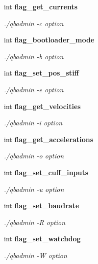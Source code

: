 \begin{DoxyCompactItemize}
int \textbf{ flag\+\_\+get\+\_\+currents}
\begin{DoxyCompactList}\small\item\em ./qbadmin -\/c option \end{DoxyCompactList}\item 
\mbox{\label{structglobal__args_a8488439bc3473b5fb08964d06b51b80a}} 
int \textbf{ flag\+\_\+bootloader\+\_\+mode}
\begin{DoxyCompactList}\small\item\em ./qbadmin -\/b option \end{DoxyCompactList}\item 
\mbox{\label{structglobal__args_ac814e1ddd60d50ef7e0aeac6a5ea38b0}} 
int \textbf{ flag\+\_\+set\+\_\+pos\+\_\+stiff}
\begin{DoxyCompactList}\small\item\em ./qbadmin -\/e option \end{DoxyCompactList}\item 
\mbox{\label{structglobal__args_aa9b8d91302ac6dbb99023c9363c352f8}} 
int \textbf{ flag\+\_\+get\+\_\+velocities}
\begin{DoxyCompactList}\small\item\em ./qbadmin -\/i option \end{DoxyCompactList}\item 
\mbox{\label{structglobal__args_af72013af180143fd3cce334fca450bec}} 
int \textbf{ flag\+\_\+get\+\_\+accelerations}
\begin{DoxyCompactList}\small\item\em ./qbadmin -\/o option \end{DoxyCompactList}\item 
\mbox{\label{structglobal__args_a8bae74d00a58818ba0dad8bc3fb46625}} 
int \textbf{ flag\+\_\+set\+\_\+cuff\+\_\+inputs}
\begin{DoxyCompactList}\small\item\em ./qbadmin -\/u option \end{DoxyCompactList}\item 
\mbox{\label{structglobal__args_aeb7e77450221e7de1da5ae0701a8c7af}} 
int \textbf{ flag\+\_\+set\+\_\+baudrate}
\begin{DoxyCompactList}\small\item\em ./qbadmin -\/R option \end{DoxyCompactList}\item 
\mbox{\label{structglobal__args_a5416bb93d203c57a7fc6fe93957f5c14}} 
int \textbf{ flag\+\_\+set\+\_\+watchdog}
\begin{DoxyCompactList}\small\item\em ./qbadmin -\/W option \end{DoxyCompactList}\item 

\end{DoxyCompactItemize}

